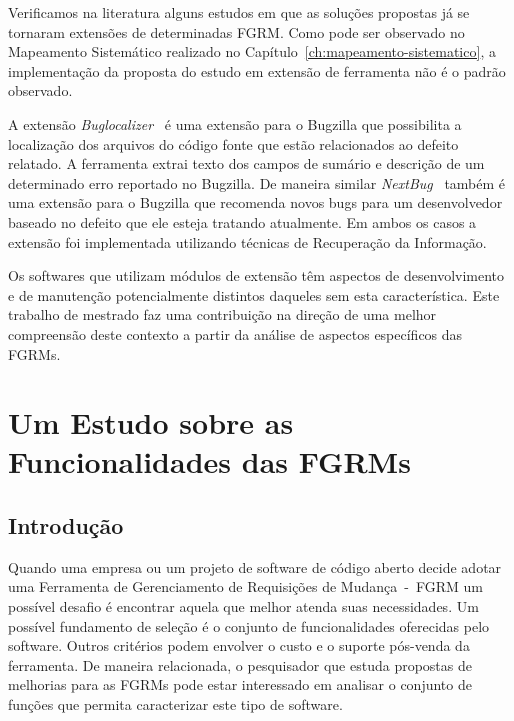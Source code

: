 Verificamos na literatura alguns estudos em que as soluções propostas já se
tornaram extensões de determinadas FGRM\@. Como pode ser observado no Mapeamento
Sistemático realizado no Capítulo~\ref{ch:mapeamento-sistematico}, a
implementação da proposta do estudo em extensão de ferramenta não é o padrão
observado.

A extensão \textit{Buglocalizer}~\cite{Thung:2014:BIT:2635868.2661678} é uma
extensão para o Bugzilla que possibilita a localização dos arquivos do código
fonte que estão relacionados ao defeito relatado. A ferramenta extrai texto dos
campos de sumário e descrição de um determinado erro reportado no Bugzilla. De
maneira similar \textit{NextBug}~\cite{101186} também é uma extensão para o
Bugzilla que recomenda novos bugs para um desenvolvedor baseado no defeito que
ele esteja tratando atualmente. Em ambos os casos a extensão foi implementada
utilizando técnicas de Recuperação da Informação.

Os softwares que utilizam módulos de extensão têm aspectos de desenvolvimento e
de manutenção potencialmente distintos daqueles sem esta característica. Este
trabalho de mestrado faz uma contribuição na direção de uma melhor compreensão
deste contexto a partir da análise de aspectos específicos das FGRMs.

\section{Um Estudo sobre as Funcionalidades das FGRMs}
\label{sec:caracterizacao_ferramentas}

\subsection{Introdução}
\label{subsec:caracterizacao_intro}

Quando uma empresa ou um projeto de software de código aberto decide adotar uma
Ferramenta de Gerenciamento de Requisições de Mudança~-~FGRM um possível desafio
é encontrar aquela que melhor atenda suas necessidades. Um possível fundamento
de seleção é o conjunto de funcionalidades oferecidas pelo software. Outros
critérios podem envolver o custo e o suporte pós-venda da ferramenta. De maneira
relacionada, o pesquisador que estuda propostas de melhorias para as FGRMs pode
estar interessado em analisar o conjunto de funções que permita caracterizar
este tipo de software.

